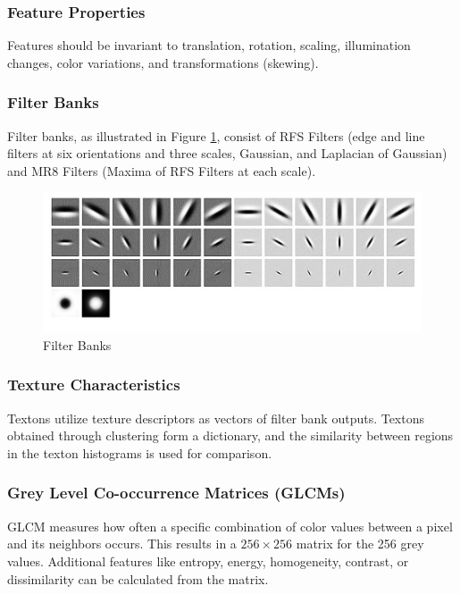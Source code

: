 \subsubsection{Feature Properties}

Features should be invariant to translation, rotation, scaling, illumination changes, color variations, and transformations (skewing).

\subsubsection{Filter Banks}

Filter banks, as illustrated in Figure \ref{fig:filter_bank},
consist of RFS Filters (edge and line filters at six orientations and three scales, Gaussian, and Laplacian of Gaussian)
and MR8 Filters (Maxima of RFS Filters at each scale).

\begin{figure}[h]
	\centering
	\includegraphics[width=0.6\linewidth]{img/filter_bank}
	\caption{Filter Banks}
	\label{fig:filter_bank}
\end{figure}

\subsubsection{Texture Characteristics}

Textons utilize texture descriptors as vectors of filter bank outputs. Textons obtained through clustering form a dictionary,
and the similarity between regions in the texton histograms is used for comparison.

\subsubsection{Grey Level Co-occurrence Matrices (GLCMs)}

GLCM measures how often a specific combination of color values between a pixel and its neighbors occurs.
This results in a $256\times 256$ matrix for the 256 grey values.
Additional features like entropy, energy, homogeneity, contrast, or dissimilarity can be calculated from the matrix.

